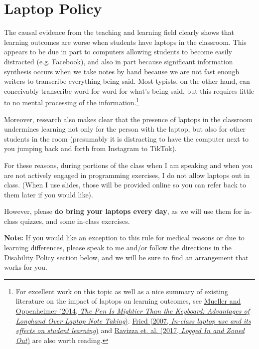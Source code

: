 \documentclass[12pt]{article}
\begin{document}
\section{Laptop Policy}

The causal evidence from the teaching and learning field clearly shows that learning outcomes are worse when students have laptops in the classroom. This appears to be due in part to computers allowing students to become easily distracted (e.g. Facebook), and also in part because significant information synthesis occurs when we take notes by hand because we are not fast enough writers to transcribe everything being said.  Most typists, on the other hand, can conceivably transcribe word for word for what's being said, but this requires little to no mental processing of the information.\footnote{For excellent work on this topic as well as a nice summary of existing literature on the impact of laptops on learning outcomes, see \href{https://cpb-us-w2.wpmucdn.com/sites.udel.edu/dist/6/132/files/2010/11/Psychological-Science-2014-Mueller-0956797614524581-1u0h0yu.pdf}{Mueller and Oppenheimer (2014, \emph{The Pen Is Mightier Than the Keyboard: Advantages of Longhand Over Laptop  Note Taking})}. \href{https://www.winona.edu/psychology/media/friedlaptopfinal.pdf}{Fried (2007, \emph{In-class laptop use and its effects on student learning})} and  \href{https://www.ncbi.nlm.nih.gov/pubmed/28182528}{Ravizza et. al. (2017, \emph{Logged In and Zoned Out})} are also worth reading.}

Moreover, research also makes clear that the presence of laptops in the classroom undermines learning not only for the person with the laptop, but also for other students in the room (presumably it is distracting to have the computer next to you jumping back and forth from Instagram to TikTok).

For these reasons, during portions of the class when I am speaking and when you are not actively engaged in programming exercises, I do not allow laptops out in class. (When I use slides, those will be provided online so you can refer back to them later if you would like).

However, please \textbf{do bring your laptops every day}, as we will use them for in-class quizzes, and some in-class exercises.

\textbf{Note:} If you would like an exception to this rule for medical reasons or due to learning differences, please speak to me and/or follow the directions in the Disability Policy section below, and we will be sure to find an arrangement that works for you.
\end{document}
